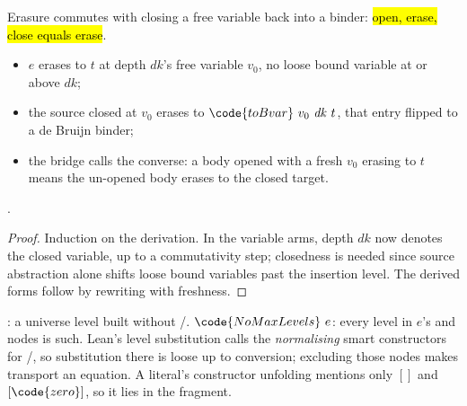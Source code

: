 \begin{theorem}
\label{thm:Erases-abstract}
\leanok
{}
 Erasure commutes with closing a free variable back into a binder: \hl{open, erase, close equals erase}.
\begin{itemize}
\item {} $e$ erases to $t$ at depth $\mathit{dk}$'s free variable $v_0$, no loose bound variable at or above $\mathit{dk}$;
\item {} the source closed at $v_0$ erases to $\code{toBvar}\ v_0\ \mathit{dk}\ t$, that entry flipped to a de Bruijn binder;
\item the bridge calls the converse: a body opened with a fresh $v_0$ erasing to $t$ means the un-opened body erases to the closed target.
\end{itemize}
 \stProved{}.
\end{theorem}
\begin{proof}
\leanok
{}
 Induction on the derivation. In the variable arms, depth $\mathit{dk}$ now
denotes the closed variable, up to a commutativity step; closedness is needed since source
abstraction alone shifts loose bound variables past the insertion level. The derived forms
follow by rewriting with freshness.
\end{proof}

\begin{definition}
\label{def:NoMaxLevels}
\leanok
{} : a universe level built without /. $\code{NoMaxLevels}\ e$: every level in $e$'s  and  nodes is such.
 Lean's level substitution calls the \emph{normalising} smart constructors for /, so substitution there is loose up to conversion; excluding those nodes makes transport an equation. A literal's constructor unfolding mentions only $[]$ and $[\code{zero}]$, so it lies in the fragment.
\end{definition}


